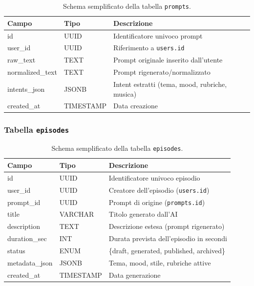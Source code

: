 \documentclass[11pt,a4paper]{article}
\begin{document}
\begin{table}[H]
    \centering
    \begin{tabular}{llp{7cm}}
        \toprule
        \textbf{Campo} & \textbf{Tipo} & \textbf{Descrizione} \\
        \midrule
        id & UUID & Identificatore univoco prompt \\
        user\_id & UUID & Riferimento a \texttt{users.id} \\
        raw\_text & TEXT & Prompt originale inserito dall’utente \\
        normalized\_text & TEXT & Prompt rigenerato/normalizzato \\
        intents\_json & JSONB & Intent estratti (tema, mood, rubriche, musica) \\
        created\_at & TIMESTAMP & Data creazione \\
        \bottomrule
    \end{tabular}
    \caption{Schema semplificato della tabella \texttt{prompts}.}
\end{table}

\subsubsection*{Tabella \texttt{episodes}}

\begin{table}[H]
    \centering
    \begin{tabular}{llp{7cm}}
        \toprule
        \textbf{Campo} & \textbf{Tipo} & \textbf{Descrizione} \\
        \midrule
        id & UUID & Identificatore univoco episodio \\
        user\_id & UUID & Creatore dell’episodio (\texttt{users.id}) \\
        prompt\_id & UUID & Prompt di origine (\texttt{prompts.id}) \\
        title & VARCHAR & Titolo generato dall’AI \\
        description & TEXT & Descrizione estesa (prompt rigenerato) \\
        duration\_sec & INT & Durata prevista dell’episodio in secondi \\
        status & ENUM & \{draft, generated, published, archived\} \\
        metadata\_json & JSONB & Tema, mood, stile, rubriche attive \\
        created\_at & TIMESTAMP & Data generazione \\
        \bottomrule
    \end{tabular}
    \caption{Schema semplificato della tabella \texttt{episodes}.}
\end{table}
\end{document}

